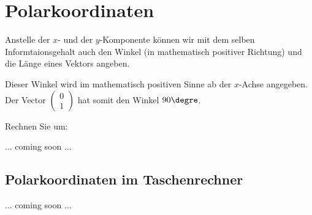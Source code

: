 
\section{Polarkoordinaten}

Anstelle der $x$- und der $y$-Komponente können wir mit dem selben
Informtaionsgehalt auch den Winkel
(in mathematisch positiver Richtung) und die Länge eines Vektors
angeben.

Dieser Winkel wird im mathematisch positiven Sinne ab der $x$-Achse
angegeben. Der Vector
$\begin{pmatrix}0\\1\end{pmatrix}$ hat somit den Winkel $90\degre$.

Rechnen Sie um:

... coming soon ...


\subsection{Polarkoordinaten im Taschenrechner}

... coming soon ...

